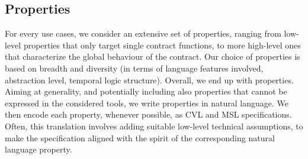 \subsection{Properties }
\label{sec:methodology:props}




For every use cases, we consider an extensive set of properties, ranging from low-level properties that only target single contract functions, to more high-level ones that characterize the global behaviour of the contract. 
Our choice of properties is based on breadth and diversity (in terms of language features involved, abstraction level, temporal logic structure). 
Overall, we end up with \nTotProperties properties. 
%
%
Aiming at generality, and potentially including also properties that cannot  be expressed in the considered tools, we write properties in natural language. 
We then encode each property, whenever possible, as CVL and MSL specifications.
Often, this translation involves adding suitable low-level technical assumptions, to make the specification aligned with the spirit of the corresponding natural language property. 
